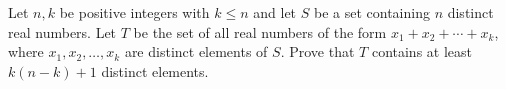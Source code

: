 Let $n,k$ be positive integers with $k\leq n$ and let $S$ be a set containing $n$ distinct real numbers. Let $T$ be the set of all real numbers of the form $x_1+x_2+\cdots+x_k$, where $x_1,x_2,\ldots,x_k$ are distinct elements of $S$. Prove that $T$ contains at least $k(n-k)+1$ distinct elements.
